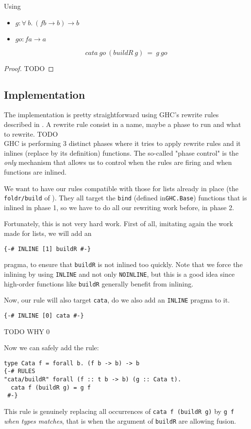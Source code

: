 \documentclass[format=sigplan]{acmart}
\newcommand{\minline}[1]{\texttt{#1}}
\begin{document}
\begin{theorem}
Using
\begin{itemize}
	\item $g : \forall\ b.\ (f b \to b) \to b$
	\item $go : f a \to a $
\end{itemize}
$$cata\ go\ (buildR\ g)\ =\ g\ go$$
\end{theorem}
\begin{proof}
	TODO
\end{proof}

\subsection{Implementation}
The implementation is pretty straightforward using GHC's rewrite rules described in \cite{pbr}. A rewrite rule consist in a name, maybe a phase to run and what to rewrite. TODO\\
GHC is performing 3 distinct phases where it tries to apply rewrite rules and it inlines (replace by its definition) functions. The so-called "phase control" is the \emph{only} mechanism that allows us to control when the rules are firing and when functions are inlined.

We want to have our rules compatible with those for lists already in place (the \verb|foldr/build| of \cite{Gill:1993:SCD:165180.165214}). They all target the \minline{bind} (defined in\verb|GHC.Base|) functions that is inlined in phase 1, so we have to do all our rewriting work before, in phase 2.

Fortunately, this is not very hard work. First of all, imitating again the work made for lists, we will add an 
\begin{verbatim}
{-# INLINE [1] buildR #-}
\end{verbatim}
pragma, to ensure that \minline{buildR} is not inlined too quickly. Note that we force the inlining by using \verb|INLINE| and not only \verb|NOINLINE|, but this is a good idea since high-order functions like \minline{buildR} generally benefit from inlining. 

Now, our rule will also target \minline{cata}, do we also add an \verb|INLINE| pragma to it.
\begin{verbatim}
{-# INLINE [0] cata #-}
\end{verbatim}

TODO WHY 0

Now we can safely add the rule:
\begin{verbatim}
type Cata f = forall b. (f b -> b) -> b
{-# RULES
"cata/buildR" forall (f :: t b -> b) (g :: Cata t).
  cata f (buildR g) = g f
 #-}
\end{verbatim}
This rule is genuinely replacing all occurrences of \minline{cata f (buildR g)} by \minline{g f} \emph{when types matches}, that is when the argument of \minline{buildR} are allowing fusion.
\end{document}
